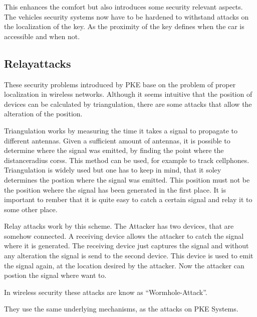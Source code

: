 	This enhances the comfort but also introduces some security relevant aspects.
	The vehicles security systems now have to be hardened
	to withstand attacks on the localization of the key.
	As the proximity of the key defines when the car is accessible and when not. 

\subsection*{Relayattacks}
	These security problems introduced by PKE base on the problem of proper
	localization in wireless networks.
	Although it seems intuitive that the position of devices can be calculated by
	triangulation, there are some attacks that allow the alteration of the position.


	Triangulation works by measuring the time it takes a signal to propagate
	to different antennas.
	Given a sufficient amount of antennas,
	it is possible to determine where the signal was emitted,
	by finding the point where the distanceradius corss. 				%
	This method can be used,
	for example to track cellphones.	%
	Triangulation is widely used but one has to keep in mind,
	that it soley determines the postion where the signal was emitted.
	This position must not be the position wehere the signal has been generated in the first place.
	It is important to rember that it is quite easy to catch
	a certain signal and relay it to some other place.

	Relay attacks work by this scheme.
	The Attacker has two devices,
	that are somehow connected.
	A receiving device allows the attacker to catch the signal where it is generated.
	The receiving device just captures the signal and
	without any alteration the signal is send to the second device.
	This device is used to emit the signal again,
	at the location desired by the attacker.
	Now the attacker can postion the signal where want to.

	In wireless security these attacks are know as ``Wormhole-Attack''.

	They use the same underlying mechanisms, as the attacks on PKE Systems.
